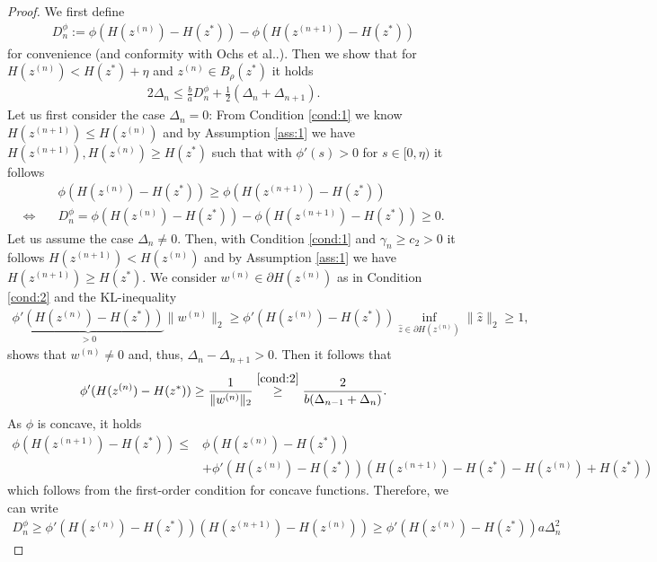\documentclass[onecolumn,final,a4paper,13pt,reqno]{siamart}
\makeatletter
\DeclareRobustCommand\onedot{\futurelet\@let@token\@onedot}
\def\@onedot{\ifx\@let@token.\else.\null\fi\xspace}
\def\etal{{et al}\onedot}
\makeatother
\begin{document}
\begin{proof}
	We first define
	\begin{align}
		D_n^\phi := \phi(H(z^{(n)}) - H(z^\ast)) - \phi(H(z^{(n + 1)}) - H(z^\ast))
	\end{align}
	for convenience (and conformity with Ochs \etal). Then we show that for $H(z^{(n)}) < H(z^\ast) + \eta$ and $z^{(n)} \in B_\rho(z^\ast)$ it holds
	\begin{align}
		2\Delta_n \leq \frac{b}{a}D_n^\phi + \frac{1}{2}(\Delta_n + \Delta_{n + 1})\label{eq:lemma-claim-1}.
	\end{align}
	Let us first consider the case $\Delta_n = 0$: From Condition \ref{cond:1} we know $H(z^{(n + 1)}) \leq H(z^{(n)})$ and by Assumption \ref{ass:1} we have $H(z^{(n + 1)}), H(z^{(n)}) \geq H(z^\ast)$ such that with $\phi'(s) > 0$ for $s \in [0,\eta)$ it follows
	\begin{align}
		&\phi(H(z^{(n)}) - H(z^\ast)) \geq \phi(H(z^{(n + 1)}) - H(z^\ast))\\
		\Leftrightarrow\quad& D_n^\phi = \phi(H(z^{(n)}) - H(z^\ast)) - \phi(H(z^{(n + 1)}) - H(z^\ast)) \geq 0.
	\end{align}
	Let us assume the case $\Delta_n \neq 0$. Then, with Condition \ref{cond:1} and $\gamma_n \geq c_2 > 0$ it follows $H(z^{(n + 1)}) < H(z^{(n)})$ and by Assumption \ref{ass:1} we have $H(z^{(n + 1)}) \geq H(z^\ast)$. We consider $w^{(n)} \in \partial H(z^{(n)})$ as in Condition \ref{cond:2} and the KL-inequality
	\begin{align}
		\underbrace{\phi'(H(z^{(n)}) - H(z^\ast))}_{> 0} \|w^{(n)}\|_2 \geq \phi'(H(z^{(n)}) - H(z^\ast)) \inf_{\hat{z} \in \partial H(z^{(n)})} \|\hat{z}\|_2 \geq 1,
	\end{align}
	shows that $w^{(n)} \neq 0$ and, thus, $\Delta_n - \Delta_{n + 1} > 0$. Then it follows that
	\begin{align}
		\phi'(H(z^{(n)}) - H(z^\ast)) \geq \frac{1}{\|w^{(n)}\|_2} \overset{\ref{cond:2}}{\geq} \frac{2}{b(\Delta_{n - 1} + \Delta_n)}.\label{eq:lemma-inequality-1}
	\end{align}
	As $\phi$ is concave, it holds
	\begin{align}
		\phi(H(z^{(n + 1)}) - H(z^\ast)) \leq &\phi(H(z^{(n)}) - H(z^\ast))\\
		&+ \phi'(H(z^{(n)}) - H(z^\ast))(H(z^{(n + 1)}) - H(z^\ast) - H(z^{(n)}) + H(z^\ast))
	\end{align}
	which follows from the first-order condition for concave functions. Therefore, we can write
	\begin{align}
		D_n^\phi \geq \phi'(H(z^{(n)}) - H(z^\ast))(H(z^{(n + 1)}) - H(z^{(n)})) \geq \phi'(H(z^{(n)}) - H(z^\ast))a\Delta_n^2\label{eq:lemma-inequality-2}

\end{align}
\end{proof}
\end{document}
